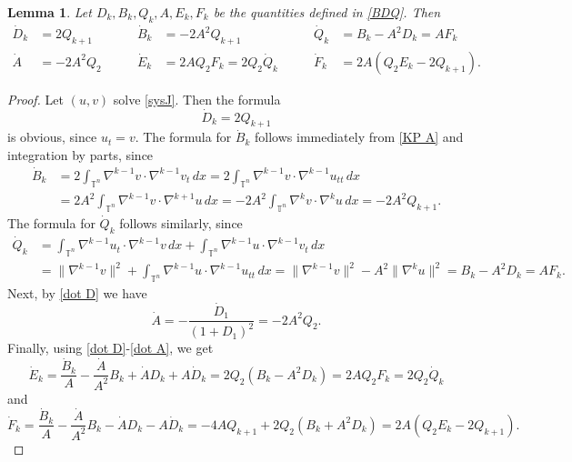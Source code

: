 \documentclass[reqno,11pt]{amsart}
\theoremstyle{plain}
\numberwithin{equation}{section}
\newtheorem{lemma}[theorem]{Lemma}
\newcommand{\T}{\mathbb{T}}
\begin{document}
{\begin{lemma}\label{time derivatives}
	Let $D_k, B_k, Q_k, A, E_k, F_k$ be the quantities defined in \eqref{BDQ}. Then
	\begin{equation}\label{BDQderivate}
		\begin{aligned}
			\dot{D}_k&=2Q_{k+1}\quad\quad&
			\dot{B}_k&=-2A^2Q_{k+1}\quad\quad&
			\dot{Q}_k&=B_k-A^2D_k=AF_k\\
			\dot{A}&=-2A^2Q_2\quad\quad&
			\dot{E}_k&=2 AQ_2 F_k= 2Q_2\dot{Q}_k\quad\quad&
			\dot{F}_k&=2A\left(Q_2E_k-2Q_{k+1}\right).
		\end{aligned}
	\end{equation}
\end{lemma}
\begin{proof}
	Let $(u,v)$ solve \eqref{sysJ}. Then the formula
	\begin{equation}\label{dot D}
		\dot{D}_k=2Q_{k+1} 
	\end{equation}
	is obvious, since $u_t=v$. The formula for $\dot{B}_k$ follows immediately from \eqref{KP A} and integration by parts, since
	\begin{equation}\label{dot B}
		\begin{aligned}
			\dot{B}_k & = 2\int_{\T^n} \nabla^{k-1}v \cdot \nabla^{k-1}v_t\, dx = 2\int_{\T^n} \nabla^{k-1}v \cdot \nabla^{k-1}u_{tt}\, dx \\
			& = 2A^2\int_{\T^n} \nabla^{k-1}v \cdot \nabla^{k+1}u\, dx = - 2A^2\int_{\T^n} \nabla^{k}v \cdot \nabla^{k}u\, dx = -2A^2Q_{k+1}.
		\end{aligned}
	\end{equation}
	The formula for $\dot{Q}_k$ follows similarly, since
	\begin{equation}\label{dot Q}
		\begin{aligned}
			\dot{Q}_k & = \int_{\T^n} \nabla^{k-1}u_t \cdot \nabla^{k-1}v\, dx + \int_{\T^n} \nabla^{k-1}u \cdot \nabla^{k-1}v_t\, dx \\
			& = \| \nabla^{k-1}v \|^2 + \int_{\T^n} \nabla^{k-1}u \cdot \nabla^{k-1}u_{tt}\, dx
			= \| \nabla^{k-1}v \|^2 - A^2  \| \nabla^k u \|^2 = B_k-A^2D_k = AF_k.
		\end{aligned}
	\end{equation}
	Next, by \eqref{dot D} we have
	\begin{equation}\label{dot A}
		\dot A = -\frac{\dot{D}_1}{(1+D_1)^2} = -2A^2Q_2.
	\end{equation}
	Finally, using \eqref{dot D}-\eqref{dot A}, we get
	\begin{equation}\label{dot E}
		\dot{E}_k=\frac{\dot{B}_k}{A}-\frac{\dot A}{A^2}B_k+{\dot A}D_k+A\dot{D}_k= 2Q_2(B_k-A^2D_k)= 2AQ_2 F_k =2Q_2\dot{Q}_k
	\end{equation}
	and
	\begin{equation}\label{dot F}
		\dot{F}_k =\frac{\dot{B}_k}{A}-\frac{\dot A}{A^2}B_k-{\dot A}D_k-A\dot{D}_k
		= -4AQ_{k+1}+2Q_2(B_k+A^2 D_k) = 2A(Q_2E_k-2Q_{k+1}).
	\end{equation}
\end{proof}



}
\end{document}
